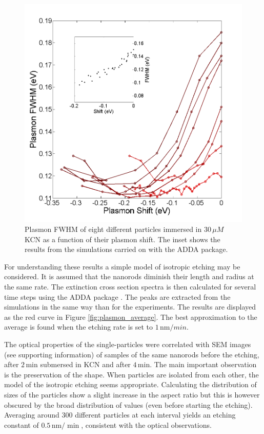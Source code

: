 \documentclass[twocolumn]{article}
\begin{document}
\begin{figure}[tp]
 \centering
 \includegraphics[width=0.95\linewidth]{fwhm_several_in_eV.png}
 \caption{Plasmon FWHM of eight different particles immersed in $30\,\mu M$ KCN
 as a function of their plasmon shift. The inset shows the results from the
 simulations carried on with the ADDA package.}
 \label{fig:FWHM}
\end{figure}

For understanding these results a simple model of isotropic etching may be
considered. It is assumed that the nanorods diminish their length and radius at
the same rate. The extinction cross section spectra is then calculated for
several time steps using the ADDA package \cite{Yurkin2011}. The peaks are
extracted from the simulations in the same way than for the experiments. The
results are displayed as the red curve in Figure \ref{fig:plasmon_average}. The
best approximation to the average is found when the etching rate is set to
$1\,\textrm{nm}/min$.

The optical properties of the single-particles were correlated with SEM images
(see supporting information) of samples of the same nanorods before the etching,
after $2\,\textrm{min}$ submersed in KCN and after $4\,\textrm{min}$. The main
important observation is the preservation of the shape. When particles are
isolated from each other, the model of the isotropic etching seems appropriate.
Calculating the distribution of sizes of the particles show a slight increase in
the aspect ratio but this is however obscured by the broad distribution of
values (even before starting the etching). Averaging around $300$ different
particles at each interval yields an etching constant of
$0.5\,\textrm{nm}/\min$, consistent with the optical observations.
\end{document}
